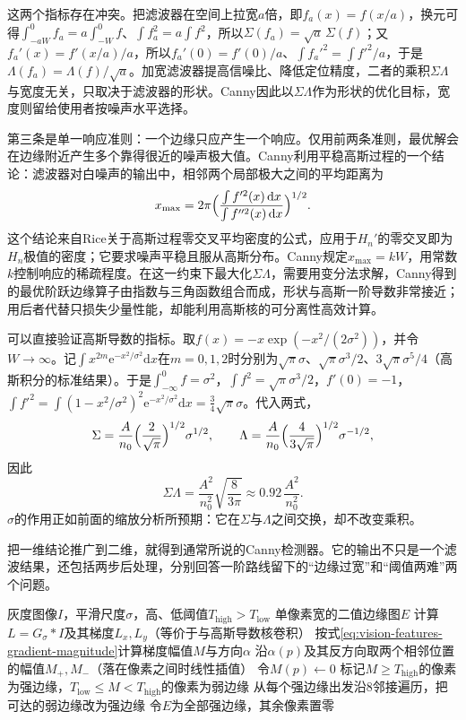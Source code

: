 这两个指标存在冲突。把滤波器在空间上拉宽$a$倍，即$f_a(x)=f(x/a)$，换元可得$\int_{-aW}^{0}f_a=a\int_{-W}^0 f$、$\int f_a^2=a\int f^2$，所以$\Sigma(f_a)=\sqrt a\,\Sigma(f)$；又$f_a'(x)=f'(x/a)/a$，所以$f_a'(0)=f'(0)/a$、$\int f_a'^2=\int f'^2/a$，于是$\Lambda(f_a)=\Lambda(f)/\sqrt a$。加宽滤波器提高信噪比、降低定位精度，二者的乘积$\Sigma\Lambda$与宽度无关，只取决于滤波器的形状。Canny因此以$\Sigma\Lambda$作为形状的优化目标，宽度则留给使用者按噪声水平选择。

第三条是单一响应准则：一个边缘只应产生一个响应。仅用前两条准则，最优解会在边缘附近产生多个靠得很近的噪声极大值。Canny利用平稳高斯过程的一个结论：滤波器对白噪声的输出中，相邻两个局部极大之间的平均距离为
\[
  x_{\max}=2\pi\Bigl(\frac{\int f'^2(x)\,\mathrm dx}{\int f''^2(x)\,\mathrm dx}\Bigr)^{1/2}.
\]
这个结论来自Rice关于高斯过程零交叉平均密度的公式，应用于$H_n'$的零交叉即为$H_n$极值的密度；它要求噪声平稳且服从高斯分布。Canny规定$x_{\max}=kW$，用常数$k$控制响应的稀疏程度。在这一约束下最大化$\Sigma\Lambda$，需要用变分法求解，Canny得到的最优阶跃边缘算子由指数与三角函数组合而成，形状与高斯一阶导数非常接近；用后者代替只损失少量性能，却能利用高斯核的可分离性高效计算。

可以直接验证高斯导数的指标。取$f(x)=-x\exp(-x^2/(2\sigma^2))$，并令$W\to\infty$。记$\int x^{2m}\mathrm e^{-x^2/\sigma^2}\mathrm dx$在$m=0,1,2$时分别为$\sqrt\pi\sigma$、$\sqrt\pi\sigma^3/2$、$3\sqrt\pi\sigma^5/4$（高斯积分的标准结果）。于是$\int_{-\infty}^0f=\sigma^2$，$\int f^2=\sqrt\pi\sigma^3/2$，$f'(0)=-1$，$\int f'^2=\int(1-x^2/\sigma^2)^2\mathrm e^{-x^2/\sigma^2}\mathrm dx=\tfrac34\sqrt\pi\sigma$。代入两式，
\[
  \Sigma=\frac{A}{n_0}\Bigl(\frac{2}{\sqrt\pi}\Bigr)^{1/2}\sigma^{1/2},\qquad
  \Lambda=\frac{A}{n_0}\Bigl(\frac{4}{3\sqrt\pi}\Bigr)^{1/2}\sigma^{-1/2},
\]
因此
\[
  \Sigma\Lambda=\frac{A^2}{n_0^2}\sqrt{\frac{8}{3\pi}}\approx0.92\,\frac{A^2}{n_0^2}.
\]
$\sigma$的作用正如前面的缩放分析所预期：它在$\Sigma$与$\Lambda$之间交换，却不改变乘积。

把一维结论推广到二维，就得到通常所说的Canny检测器。它的输出不只是一个滤波结果，还包括两步后处理，分别回答一阶路线留下的“边缘过宽”和“阈值两难”两个问题。

\begin{algorithm}[Canny边缘检测]
  \label{alg:vision-features-canny}
  \begin{algorithmic}[1]
    \Require 灰度图像$I$，平滑尺度$\sigma$，高、低阈值$T_{\mathrm{high}}>T_{\mathrm{low}}$
    \Ensure 单像素宽的二值边缘图$E$
    \State 计算$L=G_{\sigma}*I$及其梯度$L_x,L_y$（等价于与高斯导数核卷积）
    \State 按式\eqref{eq:vision-features-gradient-magnitude}计算梯度幅值$M$与方向$\alpha$
      \State 沿$\alpha(p)$及其反方向取两个相邻位置的幅值$M_+,M_-$（落在像素之间时线性插值）
        \State 令$M(p)\gets0$ 
      \EndIf
    \EndFor
    \State 标记$M\geq T_{\mathrm{high}}$的像素为强边缘，$T_{\mathrm{low}}\leq M<T_{\mathrm{high}}$的像素为弱边缘
    \State 从每个强边缘出发沿8邻接遍历，把可达的弱边缘改为强边缘 
    \State 令$E$为全部强边缘，其余像素置零
  \end{algorithmic}
\end{algorithm}

